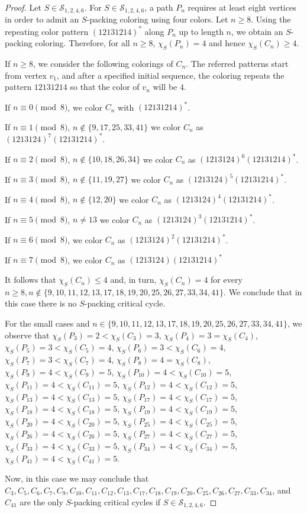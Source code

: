 \documentclass[10pt,a4paper]{amsart}
\begin{document}
\begin{proof}
	Let $S \in \mathcal S_{1,2,4,6}$. For $S \in \mathcal{S}_{1,2,4,6}$, a path $P_n$ requires at least eight vertices
	in order to admit an $S$-packing coloring using four colors. Let $n \ge 8$.
	Using the repeating color pattern $(12131214)^*$ along $P_n$ up to length $n$, we obtain an $S$-packing coloring.
	Therefore, for all $n \ge 8$, $\chi_S(P_n)=4$ and hence $\chi_S(C_n)\ge 4$.
	
	If $n \ge8$, we consider the following colorings of $C_n$.
	The referred patterns start from vertex $v_1$, and after a specified initial
	sequence, the coloring repeats the pattern $12131214$ so that the color of $v_n$ will be $4$.
	
	If $n \equiv 0 \pmod{8}$, we color $C_n$ with $(12131214)^*$.
	
	If $n \equiv 1 \pmod{8}$, $n \notin \{9, 17, 25, 33, 41\}$ we color $C_n$ as $(1213124)^7(12131214)^*$.
	
	If $n \equiv 2 \pmod{8}$, $n \notin \{10, 18, 26, 34\}$ we color $C_n$ as $(1213124)^6(12131214)^*$.
	
	If $n \equiv 3 \pmod{8}$, $n \notin \{11, 19, 27\}$ we color $C_n$ as $(1213124)^5(12131214)^*$.
	
	If $n \equiv 4 \pmod{8}$, $n \notin \{12, 20\}$ we color $C_n$ as $(1213124)^4(12131214)^*$.
	
	If $n \equiv 5 \pmod{8}$, $n \neq 13 $ we color $C_n$ as  $(1213124)^3(12131214)^*$.
	
	If $n \equiv 6 \pmod{8}$, we color $C_n$ as $(1213124)^2(12131214)^*$.
	
	If $n \equiv 7 \pmod{8}$, we color $C_n$ as $(1213124)(12131214)^*$
	
	It follows that $\chi_S(C_n) \le 4$ and, in turn, $\chi_S(C_n)=4$ for every $n \ge 8, n \notin \{9, 10, 11, 12, 13, \allowbreak 17, 18, 19, 20, 25, 26, 27, 33, 34, 41\}$.
	We conclude that in this case there is no $S$-packing critical cycle.
	
	For the small cases and $n \in \{9, 10, 11, 12, 13, \allowbreak 17, 18, 19, 20, 25, 26, 27, 33, 34, 41\}$, we observe that
	$\chi_S(P_3)=2 < \chi_S(C_3)=3$,
	$\chi_S(P_4)=3=\chi_S(C_4)$,
	$\chi_S(P_5)=3 < \chi_S(C_5)=4$,
	$\chi_S(P_6)=3 < \chi_S(C_6)=4$,
	$\chi_S(P_7)=3 < \chi_S(C_7)=4$,
	$\chi_S(P_8)=4=\chi_S(C_8)$,
	$\chi_S(P_9)=4 < \chi_S(C_9)=5$,
	$\chi_S(P_{10})=4 < \chi_S(C_{10})=5$,
	$\chi_S(P_{11})=4 < \chi_S(C_{11})=5$,
	$\chi_S(P_{12})=4 < \chi_S(C_{12})=5$,
	$\chi_S(P_{13})=4 < \chi_S(C_{13})=5$,
	$\chi_S(P_{17})=4 < \chi_S(C_{17})=5$,
	$\chi_S(P_{18})=4 < \chi_S(C_{18})=5$,
	$\chi_S(P_{19})=4 < \chi_S(C_{19})=5$,
	$\chi_S(P_{20})=4 < \chi_S(C_{20})=5$,
	$\chi_S(P_{25})=4 < \chi_S(C_{25})=5$,
	$\chi_S(P_{26})=4 < \chi_S(C_{26})=5$,
	$\chi_S(P_{27})=4 < \chi_S(C_{27})=5$,
	$\chi_S(P_{33})=4 < \chi_S(C_{33})=5$,
	$\chi_S(P_{34})=4 < \chi_S(C_{34})=5$,
	$\chi_S(P_{41})=4 < \chi_S(C_{41})=5$.
	
	Now, in this case we may conclude that $C_3, C_5, C_6, C_7, C_9, C_{10}, C_{11}, C_{12}, C_{13}, C_{17}, C_{18}, \allowbreak C_{19}, C_{20}, C_{25}, C_{26}, C_{27}, C_{33}, C_{34}$,  and $C_{41}$ are the only $S$-packing critical cycles if $S \in \mathcal S_{1,2,4,6}$.
\end{proof}
\end{document}
